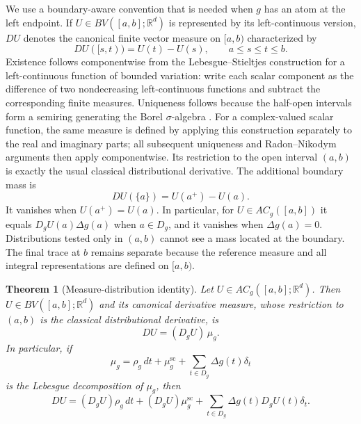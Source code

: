 \documentclass[preprint,12pt]{elsarticle}
\newcommand{\rev}[1]{{\color{red}#1}}
\newenvironment{revision}{\begingroup\color{red}}{\endgroup}
\newcommand{\rev}[1]{#1}
\newenvironment{revision}{}{}
\newcommand{\newrev}[1]{{\color{red}#1}}
\newenvironment{finalrevision}{\begingroup\color{red}}{\endgroup}
\newcommand{\newrev}[1]{#1}
\newenvironment{finalrevision}{}{}
\newtheorem{theorem}{Theorem}[section]
\theoremstyle{definition}
\theoremstyle{remark}
\newcommand{\R}{\mathbb R}
\begin{document}
\begin{revision}
We use a boundary-aware convention that is needed when \(g\) has an atom at the
left endpoint.  If \(U\in BV([a,b];\R^d)\) is represented by its
left-continuous version, \(DU\) denotes the canonical finite vector measure on
\([a,b)\) characterized by
\begin{equation}\label{eq:boundary-aware-BV-measure}
 DU([s,t))=U(t)-U(s),\qquad a\le s\le t\le b.
\end{equation}
Existence follows componentwise from the Lebesgue--Stieltjes construction for a
left-continuous function of bounded variation: write each scalar component as
the difference of two nondecreasing left-continuous functions and subtract the
corresponding finite measures.  Uniqueness follows because the half-open
intervals form a semiring generating the Borel \(\sigma\)-algebra
\cite{Bartle1995}.
\newrev{For a complex-valued scalar function, the same measure is defined by
applying this construction separately to the real and imaginary parts; all
subsequent uniqueness and Radon--Nikodym arguments then apply componentwise.}
\begin{finalrevision}
Its restriction to the open interval \((a,b)\) is exactly the usual classical
distributional derivative. The additional boundary mass is
\[
 DU(\{a\})=U(a^+)-U(a).
\]
It vanishes when \(U(a^+)=U(a)\). In particular, for \(U\in AC_g([a,b])\)
it equals \(D_gU(a)\Delta g(a)\) when \(a\in D_g\), and it vanishes when
\(\Delta g(a)=0\). Distributions tested only in \((a,b)\) cannot see a mass
located at the boundary. The final trace at \(b\) remains separate because the
reference measure and all integral representations are defined on \([a,b)\).
\end{finalrevision}
\end{revision}

\begin{theorem}[Measure-distribution identity]\label{thm:general-classical-measure}
Let $U\in AC_g([a,b];\R^d)$. Then $U\in BV([a,b];\R^d)$ and its
\rev{canonical derivative measure, whose restriction to \((a,b)\) is the
classical distributional derivative, is}
\begin{equation}\label{eq:DU-general}
 DU=(D_gU)\,\mu_g.
\end{equation}
In particular, if
\begin{equation}\label{eq:Lebesgue-decomp-g}
 \mu_g=\rho_g\,dt+\mu_g^{\mathrm{sc}}
 +\sum_{t\in D_g}\Delta g(t)\delta_t
\end{equation}
is the Lebesgue decomposition of $\mu_g$, then
\begin{equation}\label{eq:DU-decomposed}
 DU=(D_gU)\rho_g\,dt
 +(D_gU)\mu_g^{\mathrm{sc}}
 +\sum_{t\in D_g}\Delta g(t)D_gU(t)\delta_t.
\end{equation}
\end{theorem}
\end{document}
